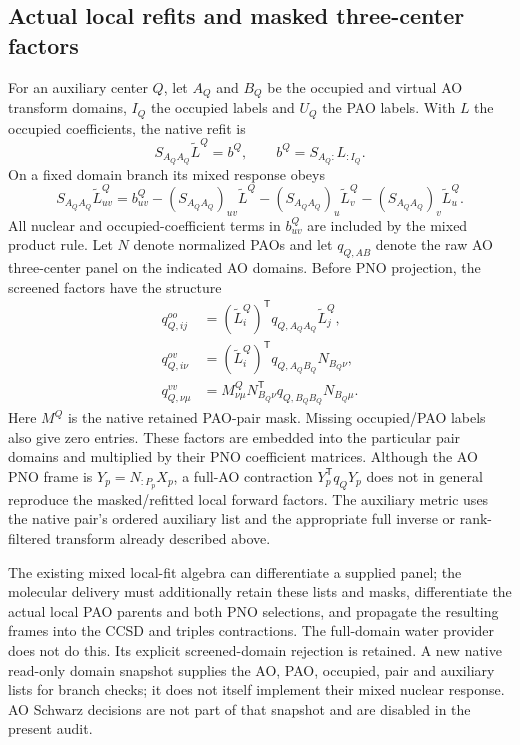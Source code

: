 \documentclass[11pt]{article}
\begin{document}
\subsection{Actual local refits and masked three-center factors}
For an auxiliary center $Q$, let $A_Q$ and $B_Q$ be the occupied and virtual AO
transform domains, $I_Q$ the occupied labels and $U_Q$ the PAO labels. With
$L$ the occupied coefficients, the native refit is
\begin{equation}
 S_{A_QA_Q}\widetilde L^Q=b^Q,\qquad
 b^Q=S_{A_Q:}L_{:I_Q}.
\end{equation}
On a fixed domain branch its mixed response obeys
\begin{equation}
 S_{A_QA_Q}\widetilde L^Q_{uv}
 =b^Q_{uv}-(S_{A_QA_Q})_{uv}\widetilde L^Q
 -(S_{A_QA_Q})_u\widetilde L^Q_v
 -(S_{A_QA_Q})_v\widetilde L^Q_u.
\end{equation}
All nuclear and occupied-coefficient terms in $b^Q_{uv}$ are included by the
mixed product rule. Let $N$ denote normalized PAOs and let $q_{Q,AB}$ denote
the raw AO three-center panel on the indicated AO domains. Before PNO
projection, the screened factors have the structure
\begin{align}
 q^{oo}_{Q,ij}&=(\widetilde L^Q_i)^{\mathsf T}
                    q_{Q,A_QA_Q}\widetilde L^Q_j,\\
 q^{ov}_{Q,i\nu}&=(\widetilde L^Q_i)^{\mathsf T}
                    q_{Q,A_QB_Q}N_{B_Q\nu},\\
 q^{vv}_{Q,\nu\mu}&=M^Q_{\nu\mu}N_{B_Q\nu}^{\mathsf T}
                    q_{Q,B_QB_Q}N_{B_Q\mu}.
\end{align}
Here $M^Q$ is the native retained PAO-pair mask. Missing occupied/PAO labels
also give zero entries. These factors are embedded into the particular pair
domains and multiplied by their PNO coefficient matrices. Although the AO
PNO frame is $Y_p=N_{:P_p}X_p$, a full-AO contraction $Y_p^{\mathsf T}q_QY_p$
does not in general reproduce the masked/refitted local forward factors.
The auxiliary metric uses the native pair's ordered auxiliary list and the
appropriate full inverse or rank-filtered transform already described above.

The existing mixed local-fit algebra can differentiate a supplied panel;
the molecular delivery must additionally retain these lists and masks,
differentiate the actual local PAO parents and both PNO selections, and
propagate the resulting frames into the CCSD and triples contractions.
The full-domain water provider does not do this. Its explicit screened-domain
rejection is retained. A new native read-only domain snapshot supplies the
AO, PAO, occupied, pair and auxiliary lists for branch checks; it does not
itself implement their mixed nuclear response. AO Schwarz decisions are not
part of that snapshot and are disabled in the present audit.
\end{document}
